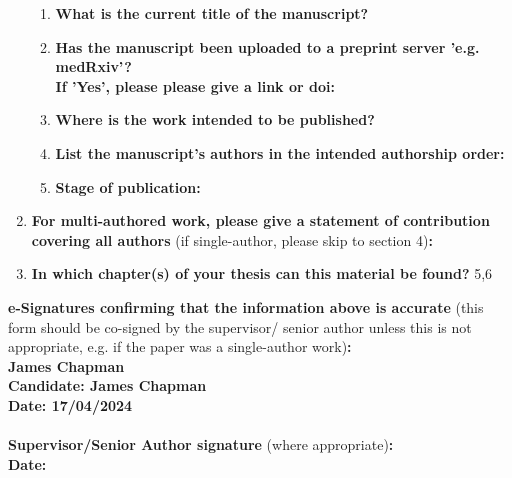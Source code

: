 \begin{enumerate}
%		
	\begin{enumerate}\itemsep0em
		\item \textbf{What is the current title of the manuscript?}
		\item \textbf{Has the manuscript been uploaded to a preprint server 'e.g. medRxiv'? 
		\\
		If 'Yes', please please give a link or doi:}
		\item \textbf{Where is the work intended to be published?}
		\item \textbf{List the manuscript's authors in the intended authorship order:}
		\item \textbf{Stage of publication:}
	\end{enumerate}
	
	\item \textbf{For multi-authored work, please give a statement of contribution covering all authors} (if single-author, please skip to section 4)\textbf{:}
	\item \textbf{In which chapter(s) of your thesis can this material be found?}
	5,6
\end{enumerate}

	\textbf{e-Signatures confirming that the information above is accurate}
	(this form should be co-signed by the supervisor/ senior author unless this is not appropriate, e.g. if the paper was a single-author work)\textbf{:}\\
	\textbf{James Chapman}\\ 
	\textbf{Candidate: James Chapman}\\
	\textbf{Date: 17/04/2024}\\
	\textbf{}\\
	\textbf{Supervisor/Senior Author signature} (where appropriate)\textbf{:}\\
	\textbf{Date:}


% 
